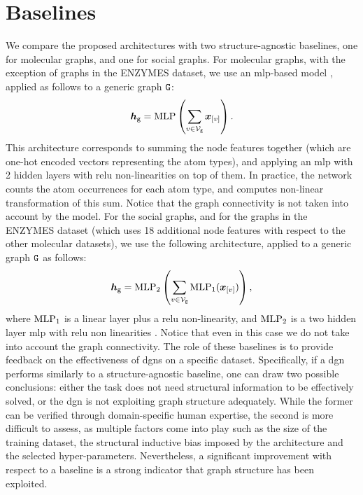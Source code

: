 \section{Baselines}
We compare the proposed architectures with two structure-agnostic baselines, one for molecular graphs, and one for social graphs. For molecular graphs, with the exception of graphs in the ENZYMES dataset, we use an \gls{mlp}-based model \citep{ralaivola2005graphkernels}, applied as follows to a generic graph $\GraphU{g}$:
$$\GraphRepr{g} = \Fun{MLP}\Par{\sum_{v \in \Nodes{g}} \Elem{x}{v}}.$$
This architecture corresponds to summing the node features together (which are one-hot encoded vectors representing the atom types), and applying an \gls{mlp} with 2 hidden layers with \gls{relu} non-linearities on top of them. In practice, the network counts the atom occurrences for each atom type, and computes non-linear transformation of this sum. Notice that the graph connectivity is not taken into account by the model.
For the social graphs, and for the graphs in the ENZYMES dataset (which uses 18 additional node features with respect to the other molecular datasets), we use the following architecture, applied to a generic graph $\GraphU{g}$ as follows:
$$\GraphRepr{g} = \Fun{MLP}_2\Par{\sum_{v \in \Nodes{g}} \Fun{MLP}_1(\Elem{x}{v})},$$
where $\mathrm{MLP}_1$ is a linear layer plus a \gls{relu} non-linearity, and $\mathrm{MLP}_2$ is a two hidden layer \gls{mlp} with \gls{relu} non linearities \citep{zaheer2017deepsets}. Notice that even in this case we do not take into account the graph connectivity. The role of these baselines is to provide feedback on the effectiveness of \glspl{dgn} on a specific dataset. Specifically, if a \gls{dgn} performs similarly to a structure-agnostic baseline, one can draw two possible conclusions: either the task does not need structural information to be effectively solved, or the \gls{dgn} is not exploiting graph structure adequately. While the former can be verified through domain-specific human expertise, the second is more difficult to assess, as multiple factors come into play such as the size of the training dataset, the structural inductive bias imposed by the architecture and the selected hyper-parameters. Nevertheless, a significant improvement with respect to a baseline is a strong indicator that graph structure has been exploited.

